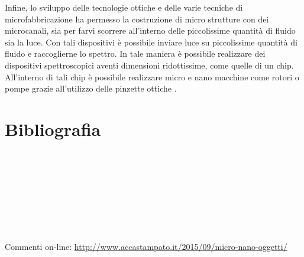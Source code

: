 Infine, lo sviluppo delle tecnologie ottiche e delle varie tecniche di microfabbricazione ha permesso la costruzione di micro strutture con dei microcanali, sia per farvi scorrere all'interno delle piccolissime quantità di fluido sia la luce. Con tali dispositivi è possibile inviare luce su piccolissime quantità di fluido e raccoglierne lo spettro. In tale maniera è possibile realizzare dei dispositivi spettroscopici aventi dimensioni ridottissime, come quelle di un chip. All'interno di tali chip è possibile realizzare micro e nano macchine come rotori o pompe grazie all'utilizzo delle pinzette ottiche \cite{jones2009rotation}.

\section*{Bibliografia}
\\
\\
\\
\\
\\
\\
\\

\smallskip
Commenti on-line: \url{http://www.accastampato.it/2015/09/micro-nano-oggetti/}
